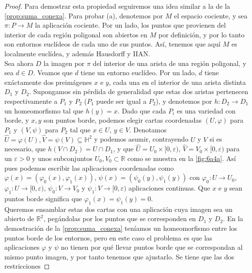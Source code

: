 \documentclass[10pt]{report}
\newcommand{\R}{\mathbb{R}}
\theoremstyle{definition}
\begin{document}
\begin{proof} 
Para demostrar esta propiedad seguiremos una idea similar a la de la \autoref{prop:suma_conexa}. Para probar (a), denotemos por $M$ el espacio cociente, y sea $\pi :P\to M$ la aplicación cociente.  %
Por un lado, los puntos que provienen del interior de cada región poligonal son abiertos en $M$ por definición, y por lo tanto son entornos euclídeos de cada uno de sus puntos. Así, tenemos que aquí $M$ es localmente euclídea, y además Hausdorff y IIAN. \\
Sea ahora $D$ la imagen por $\pi$ del interior de una arista de una región poligonal, y sea $d\in D$. Veamos que $d$ tiene un entorno euclídeo. Por un lado, $d$ tiene exáctamente dos preimágenes $x$ e $y$, cada una en el interior de una arista distinta $D_1$ y $D_2$. Supongamos sin pérdida de generalidad que estas dos aristas pertenecen respectivamente a $P_1$ y $P_2$ ($P_1$ puede ser igual a $P_2$), y denotemos por $h:D_2\to D_1$ un homeomorfismo tal que $h(y)=x$. Dado que cada $P_i$ es una variedad con borde, y $x,y$ son puntos borde, podemos elegir cartas coordenadas $(U,\varphi)$  para $P_1$ y $(V,\psi)$ para $P_2$ tal que $x\in U$, $y\in V$. Denotamos $\widehat{U}=\varphi(U),\widehat{V}=\psi(V)\subseteq \mathbb{H}^2$ y podemos asumir, contrayendo $U$ y $V$ si es necesario, que $h(V\cap D_2)=U\cap D_1$, y que $\widehat{U}=U_0\times [0,\varepsilon)$, $\widehat{V}=V_0\times [0,\varepsilon)$  para un $\varepsilon >0$ y unos subconjuntos $U_0, V_0 \subset \R$ como se muestra en la \autoref{fig:6a4a}. Así pues podemos escribir las aplicaciones coordenadas como $\varphi(x)=(\varphi_0(x),\varphi_1(x))$, $\psi(x)=(\psi_0(y),\psi_1(y))$ con $\varphi_0:U\to U_0$, $\varphi_1:U\to [0,\varepsilon)$, $\psi_0:V\to V_0$ y $\psi_1:V\to [0,\varepsilon)$ aplicaciones continuas. Que $x$ e $y$ sean puntos borde significa que $\varphi_1(x)=\psi_1(y)=0$.\\
Queremos ensamblar estas dos cartas con una aplicación cuya imagen sea un abierto de $\R^2$, pegándolas por los puntos que se corresponden en $D_1$ y $D_2$. En la demostración de la \autoref{prop:suma_conexa} teníamos un homeomorfismo entre los puntos borde de los entornos, pero en este caso el problema es que las aplicaciones $\varphi$ y $\psi$ no tienen por qué llevar puntos borde que se correspondan al mismo punto imagen, y por tanto tenemos que ajustarlo. Se tiene que las dos restricciones 

\end{proof}
\end{document}
